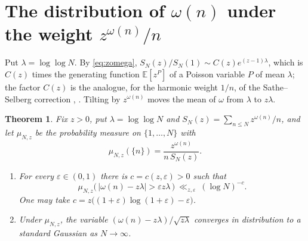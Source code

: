 \documentclass[11pt]{amsart}
\newtheorem{theorem}{Theorem}[section]
\theoremstyle{definition}
\newcommand{\Ee}{\mathbb E}
\newcommand{\loglog}{\log\log}
\begin{document}
\section{The distribution of \texorpdfstring{$\omega(n)$}{omega(n)} under the weight
\texorpdfstring{$z^{\omega(n)}/n$}{z\textasciicircum omega(n)/n}}\label{sec:ld}

Put $\lambda=\loglog N$. By \eqref{eq:zomega}, $S_N(z)/S_N(1)\sim C(z)e^{(z-1)\lambda}$, which is $C(z)$ times
the generating function $\Ee[z^{P}]$ of a Poisson variable $P$ of mean $\lambda$; the factor $C(z)$ is the
analogue, for the harmonic weight $1/n$, of the Sathe--Selberg correction \cite{Sathe,SelbergSathe},
\cite[Ch.~II.6]{Tenenbaum}. Tilting by $z^{\omega(n)}$ moves the mean of $\omega$ from $\lambda$ to $z\lambda$.

\begin{theorem}\label{thm:ld}
Fix $z>0$, put $\lambda=\loglog N$ and $S_N(z)=\sum_{n\le N}z^{\omega(n)}/n$, and let $\mu_{N,z}$ be the
probability measure on $\{1,\dots,N\}$ with
\[
\mu_{N,z}(\{n\})=\frac{z^{\omega(n)}}{n\,S_N(z)} .
\]
\begin{enumerate}[label=\textup{(\roman*)}]
\item For every $\varepsilon\in(0,1)$ there is $c=c(z,\varepsilon)>0$ such that
\[
\mu_{N,z}\bigl(\,|\omega(n)-z\lambda|>\varepsilon z\lambda\,\bigr)\ \ll_{z,\varepsilon}\ (\log N)^{-c}.
\]
One may take $c=z\bigl((1+\varepsilon)\log(1+\varepsilon)-\varepsilon\bigr)$.
\item Under $\mu_{N,z}$, the variable $(\omega(n)-z\lambda)/\sqrt{z\lambda}$ converges in distribution to a
standard Gaussian as $N\to\infty$.
\end{enumerate}
\end{theorem}
\end{document}
